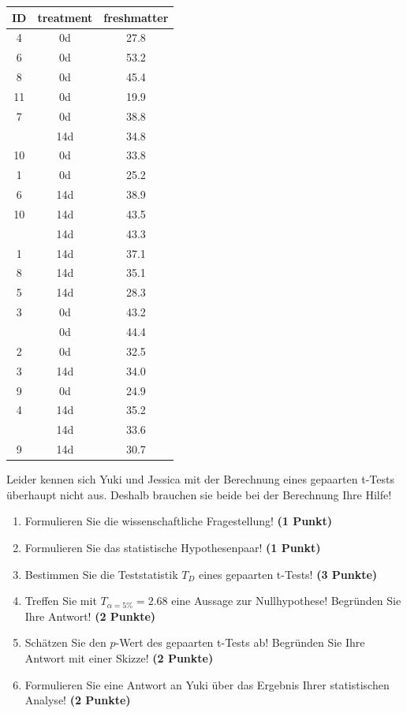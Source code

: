 \documentclass[a4paper, 9pt]{scrartcl}\usepackage[]{graphicx}\usepackage[]{xcolor}
\begin{document}
\begin{table}[!h]
\centering
\begin{tabular}{ccc}
\toprule
ID & treatment & freshmatter\\
\midrule
4 & 0d & 27.8\\
6 & 0d & 53.2\\
8 & 0d & 45.4\\
11 & 0d & 19.9\\
7 & 0d & 38.8\\
\addlinespace
7 & 14d & 34.8\\
10 & 0d & 33.8\\
1 & 0d & 25.2\\
6 & 14d & 38.9\\
10 & 14d & 43.5\\
\addlinespace
11 & 14d & 43.3\\
1 & 14d & 37.1\\
8 & 14d & 35.1\\
5 & 14d & 28.3\\
3 & 0d & 43.2\\
\addlinespace
5 & 0d & 44.4\\
2 & 0d & 32.5\\
3 & 14d & 34.0\\
9 & 0d & 24.9\\
4 & 14d & 35.2\\
\addlinespace
2 & 14d & 33.6\\
9 & 14d & 30.7\\
\bottomrule
\end{tabular}
\end{table}



Leider kennen sich Yuki und Jessica mit der Berechnung eines gepaarten t-Tests überhaupt nicht aus. Deshalb brauchen sie beide bei der Berechnung Ihre Hilfe!

\begin{enumerate}
  \item Formulieren Sie die wissenschaftliche Fragestellung! \textbf{(1 Punkt)}
  \item Formulieren Sie das statistische Hypothesenpaar! \textbf{(1 Punkt)}
  \item Bestimmen Sie die Teststatistik $T_{D}$ eines gepaarten t-Tests! \textbf{(3 Punkte)}
  \item Treffen Sie mit $T_{\alpha = 5\%} = 2.68$ eine Aussage zur Nullhypothese! Begründen Sie Ihre Antwort! \textbf{(2 Punkte)}
\item Schätzen Sie den $p$-Wert des gepaarten t-Tests ab! Begründen Sie Ihre Antwort mit einer Skizze! \textbf{(2 Punkte)}
\item Formulieren Sie eine Antwort an Yuki über das Ergebnis Ihrer statistischen Analyse! \textbf{(2 Punkte)}
\end{enumerate}
\end{document}
